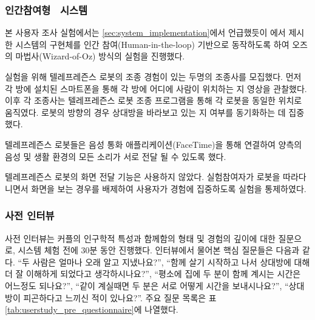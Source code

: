 \subsubsection{인간참여형 \sysname\ 시스템}

본 사용자 조사 실험에서는 \ref{sec:system_implementation}에서 언급했듯이 \cite{kang2018homemeld}에서 제시한 \sysname 시스템의 구현체를 인간 참여(Human-in-the-loop) 기반으로 동작하도록 하여 오즈의 마법사(Wizard-of-Oz) 방식의 실험을 진행했다.

실험을 위해 텔레프레즌스 로봇의\cite{double_robotics} 조종 경험이 있는 두명의 조종사를 모집했다. 먼저 각 방에 설치된 스마트폰을 통해 각 방에 어디에 사람이 위치하는 지 영상을 관찰했다. 이후 각 조종사는 텔레프레즌스 로봇 조종 프로그램을\cite{double_drive} 통해 각 로봇을 동일한 위치로 움직였다. 로봇의 방향의 경우 상대방을 바라보고 있는 지 여부를 동기화하는 데 집중했다.

텔레프레즌스 로봇들은 음성 통화 애플리케이션(FaceTime)을 통해 연결하여 양측의 음성 및 생활 환경의 모든 소리가 서로 전달 될 수 있도록 했다. 

텔레프레즌스 로봇의 화면 전달 기능은 사용하지 않았다. 실험참여자가 로봇을 따라다니면서 화면을 보는 경우를 배제하여 사용자가  경험에 집중하도록 실험을 통제하였다.



\subsubsection{사전 인터뷰}

사전 인터뷰는 커플의 인구학적 특성과 함께함의 형태 및 경험의 깊이에 대한 질문으로, 시스템 체험 전에 30분 동안 진행했다. 인터뷰에서 물어본 핵심 질문들은 다음과 같다. ``두 사람은 얼마나 오래 알고 지냈나요?'', ``함께 살기 시작하고 나서 상대방에 대해 더 잘 이해하게 되었다고 생각하시나요?'', ``평소에 집에 두 분이 함께 계시는 시간은 어느정도 되나요?'', ``같이 계실때면 두 분은 서로 어떻게 시간을 보내시나요?'', ``상대방이 피곤하다고 느끼신 적이 있나요?''. 주요 질문 목록은 표 \ref{tab:userstudy_pre_questionnaire}에 나열했다.


